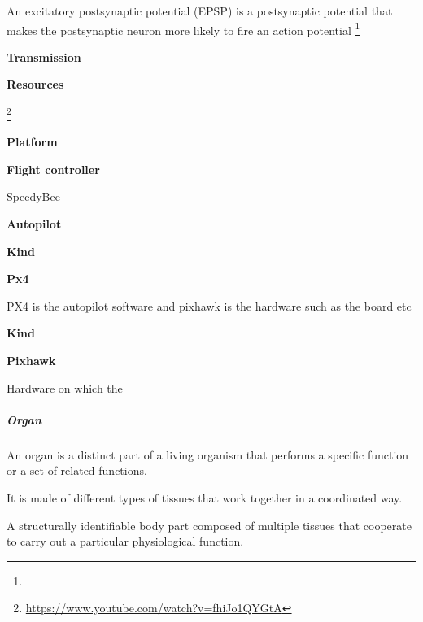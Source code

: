 \documentclass{book}
\providecommand{\ProjectDeepHeading}[2]{%
    \par\medskip\noindent\textbf{#2}\par\smallskip
}
\providecommand{\seeherefooter}[1]{\footnote{\url{#1}}}
\begin{document}

An excitatory postsynaptic potential (EPSP) is a postsynaptic potential that makes the postsynaptic neuron more likely to fire an action potential \footnote{}

\ProjectDeepHeading{5}{Transmission}


\ProjectDeepHeading{8}{Resources}
        \seeherefooter{https://www.youtube.com/watch?v=fhiJo1QYGtA}

\ProjectDeepHeading{1}{Platform}

\ProjectDeepHeading{2}{Flight controller}


SpeedyBee

\ProjectDeepHeading{3}{Autopilot}

\ProjectDeepHeading{4}{Kind}

\ProjectDeepHeading{5}{Px4}


PX4 is the autopilot software and pixhawk is the hardware such as the board etc

\ProjectDeepHeading{3}{Kind}

\ProjectDeepHeading{4}{Pixhawk}


Hardware on which the

\subparagraph{Organ}


An organ is a distinct part of a living organism that performs a specific function or a set of related functions.


    It is made of different types of tissues that work together in a coordinated way.
    
    A structurally identifiable body part composed of multiple tissues that cooperate to carry out a particular physiological function.
    
\end{document}
